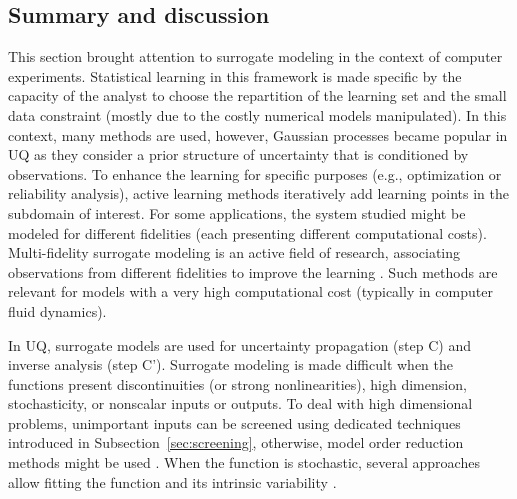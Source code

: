 \subsection{Summary and discussion}

This section brought attention to surrogate modeling in the context of computer experiments. 
Statistical learning in this framework is made specific by the capacity of the analyst to choose the repartition of the learning set and the small data constraint (mostly due to the costly numerical models manipulated). 
In this context, many methods are used, however, Gaussian processes became popular in UQ as they consider a prior structure of uncertainty that is conditioned by observations.%
To enhance the learning for specific purposes (e.g., optimization or reliability analysis), active learning methods iteratively add learning points in the subdomain of interest. 
For some applications, the system studied might be modeled for different fidelities (each presenting different computational costs). 
Multi-fidelity surrogate modeling is an active field of research, associating observations from different fidelities to improve the learning \citep{fernandez_2016_review_multifi}. 
Such methods are relevant for models with a very high computational cost (typically in computer fluid dynamics).  

In UQ, surrogate models are used for uncertainty propagation (step C) and inverse analysis (step C'). 
Surrogate modeling is made difficult when the functions present discontinuities (or strong nonlinearities), high dimension, stochasticity, or nonscalar inputs or outputs. 
To deal with high dimensional problems, unimportant inputs can be screened using dedicated techniques introduced in Subsection~\ref{sec:screening}, otherwise, model order reduction methods might be used \citep{schilders_2008}. 
When the function is stochastic, several approaches allow fitting the function and its intrinsic variability \citep{binois_2019_replication,baker_2022_stochastic_surrogates_review,zhu_2023_thesis}. 



